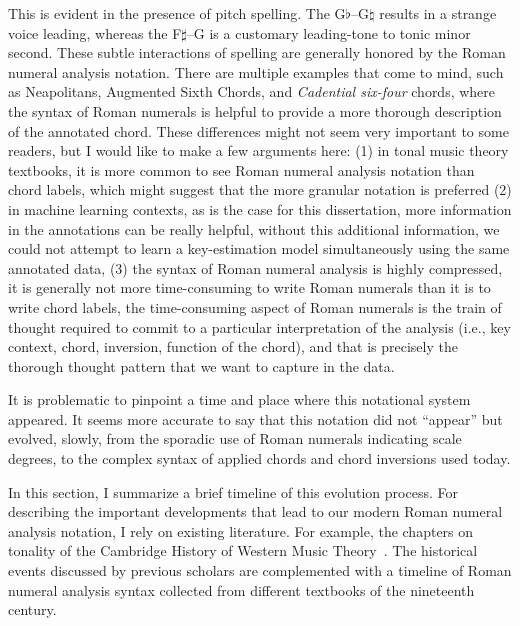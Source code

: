 This is evident in the presence of pitch spelling.
The G$\flat$--G$\natural$ results in a strange voice leading, whereas the F$\sharp$--G is a customary leading-tone to tonic minor second.
These subtle interactions of spelling are generally honored by the Roman numeral analysis notation.
There are multiple examples that come to mind, such as Neapolitans, Augmented Sixth Chords, and \emph{Cadential six-four} chords, where the syntax of Roman numerals is helpful to provide a more thorough description of the annotated chord.
These differences might not seem very important to some readers, but I would like to make a few arguments here: (1) in tonal music theory textbooks, it is more common to see Roman numeral analysis notation than chord labels, which might suggest that the more granular notation is preferred (2) in machine learning contexts, as is the case for this dissertation, more information in the annotations can be really helpful, without this additional information, we could not attempt to learn a key-estimation model simultaneously using the same annotated data, (3) the syntax of Roman numeral analysis is highly compressed, it is generally not more time-consuming to write Roman numerals than it is to write chord labels, the time-consuming aspect of Roman numerals is the train of thought required to commit to a particular interpretation of the analysis (i.e., key context, chord, inversion, function of the chord), and that is precisely the thorough thought pattern that we want to capture in the data.


It is problematic to pinpoint a time and place where this notational system appeared.
It seems more accurate to say that this notation did not ``appear'' but evolved, slowly, from the sporadic use of Roman numerals indicating scale degrees, to the complex syntax of applied chords and chord inversions used today.

In this section, I summarize a brief timeline of this evolution process.
For describing the important developments that lead to our modern Roman numeral analysis notation, I rely on existing literature.
For example, the chapters on tonality of the Cambridge History of Western Music Theory~\parencite{christensen_tonality_2002, christensen_rameau_2002, christensen_nineteenth-century_2002, christensen_heinrich_2002}.
The historical events discussed by previous scholars are complemented with a timeline of Roman numeral analysis syntax collected from different textbooks of the nineteenth century.

